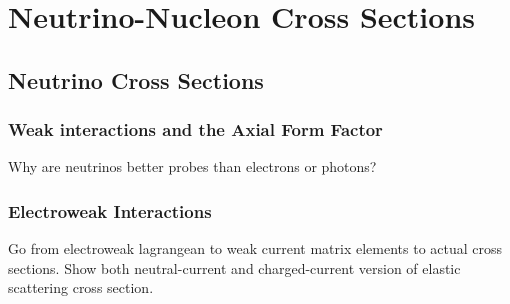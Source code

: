 \section{Neutrino-Nucleon Cross Sections} \label{sec:theory}
\hspace{\parindent}

\subsection{Neutrino Cross Sections}\label{sec:probe}
  \subsubsection{Weak interactions and the Axial Form Factor}
    Why are neutrinos better probes than electrons or photons?
  \subsubsection{Electroweak Interactions}
    Go from electroweak lagrangean to weak current matrix elements to actual
    cross sections. Show both neutral-current and charged-current version of
    elastic scattering cross section.

